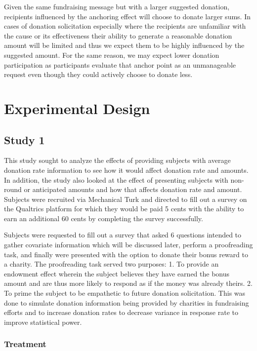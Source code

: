 \documentclass[]{article}
\begin{document}
Given the same fundraising message but with a larger suggested donation,
recipients influenced by the anchoring effect will choose to donate
larger sums. In cases of donation solicitation especially where the
recipients are unfamiliar with the cause or its effectiveness their
ability to generate a reasonable donation amount will be limited and
thus we expect them to be highly influenced by the suggested amount. For
the same reason, we may expect lower donation participation as
participants evaluate that anchor point as an unmanageable request even
though they could actively choose to donate less.

\section{Experimental Design}\label{experimental-design}

\subsection{Study 1}\label{study-1}

This study sought to analyze the effects of providing subjects with
average donation rate information to see how it would affect donation
rate and amounts. In addition, the study also looked at the effect of
presenting subjects with non-round or anticipated amounts and how that
affects donation rate and amount. Subjects were recruited via Mechanical
Turk and directed to fill out a survey on the Qualtrics platform for
which they would be paid 5 cents with the ability to earn an additional
60 cents by completing the survey successfully.

Subjects were requested to fill out a survey that asked 6 questions
intended to gather covariate information which will be discussed later,
perform a proofreading task, and finally were presented with the option
to donate their bonus reward to a charity. The proofreading task served
two purposes: 1. To provide an endowment effect wherein the subject
believes they have earned the bonus amount and are thus more likely to
respond as if the money was already theirs. 2. To prime the subject to
be empathetic to future donation solicitation. This was done to simulate
donation information being provided by charities in fundraising efforts
and to increase donation rates to decrease variance in response rate to
improve statistical power.

\subsubsection{Treatment}\label{treatment}
\end{document}
